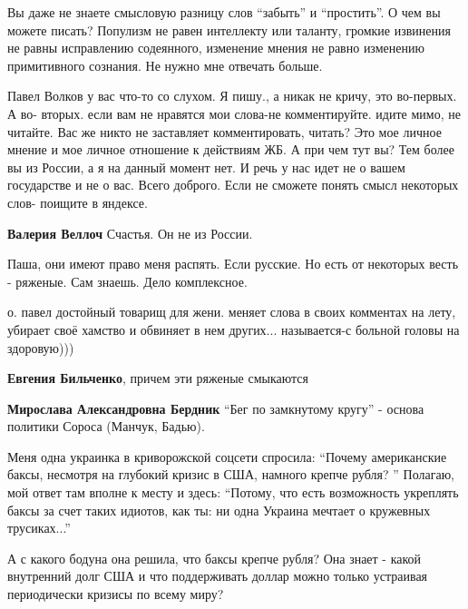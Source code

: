 \begin{itemize}
\begin{itemize}

Вы даже не знаете смысловую разницу слов \enquote{забыть} и \enquote{простить}. О чем вы можете
писать? Популизм не равен интеллекту или таланту, громкие извинения не равны
исправлению содеянного, изменение мнения не равно изменению примитивного
сознания. Не нужно мне отвечать больше.


Павел Волков у вас что-то со слухом. Я пишу., а никак не кричу, это во-первых.
А во- вторых. если вам не нравятся мои слова-не комментируйте. идите мимо, не
читайте. Вас же никто не заставляет комментировать, читать? Это мое личное
мнение и мое личное отношение к действиям ЖБ. А при чем тут вы? Тем более вы из
России, а я на данный момент нет. И речь у нас идет не о вашем государстве и не
о вас. Всего доброго. Если не сможете понять смысл некоторых слов- поищите в
яндексе.

\textbf{Валерия Веллоч} Счастья. Он не из России.

Паша, они имеют право меня распять. Если русские. Но есть от некоторых весть - ряженые. Сам знаешь. Дело комплексное.


о. павел достойный товарищ для жени. меняет слова в своих комментах на лету, убирает своё хамство и обвиняет в нем других... называется-с больной головы на здоровую)))

\textbf{Евгения Бильченко}, причем эти ряженые смыкаются

\textbf{Мирослава Александровна Бердник} \enquote{Бег по замкнутому кругу} - основа политики Сороса (Манчук, Бадью).

\end{itemize}


Меня одна украинка в криворожской соцсети спросила: \enquote{Почему
американские баксы, несмотря на глубокий кризис в США, намного крепче рубля? }
Полагаю, мой ответ там вполне к месту и здесь: \enquote{Потому, что есть
возможность укреплять баксы за счет таких идиотов, как ты: ни одна Украина
мечтает о кружевных трусиках...}


А с какого бодуна она решила, что баксы крепче рубля? Она знает - какой внутренний долг США и что поддерживать доллар можно только устраивая периодически кризисы по всему миру?


\end{itemize}
